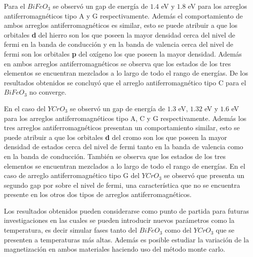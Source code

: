Para el $BiFeO_{3}$ se observ\'o un gap de energ\'ia de $1.4$ eV y $1.8$ eV 
para los arreglos antiferromagn\'eticos tipo A y G respectivamente. Adem\'as  
el comportamiento de ambos arreglos 
antiferromagn\'eticos es similar, esto se puede atribuir a que los orbitales 
\textbf{d} del hierro 
son los que poseen la mayor densidad cerca del nivel de fermi en la banda de 
conducci\'on y en la banda de valencia cerca del nivel de fermi son los 
orbitales \textbf{p} del ox\'igeno los que poseen la mayor densidad. Adem\'as 
en ambos arreglos antiferromagn\'eticos se observa que los estados de los tres 
elementos se encuentran mezclados a lo largo de todo el rango de energ\'ias. De 
los resultados obtenidos se concluy\'o que el arreglo antiferromagn\'etico tipo 
C para el $BiFeO_{3}$ no converge.


\noindent En el caso del $YCrO_{3}$ se observ\'o un gap de energ\'ia de $1.3$ 
eV, $1.32$ eV y $1.6$ eV 
para los arreglos antiferromagn\'eticos tipo A, C y G respectivamente. Adem\'as 
los tres arreglos antiferromagn\'eticos presentan un comportamiento similar, 
esto se puede atribuir a que 
los orbitales \textbf{d} del cromo son los que poseen la mayor densidad de 
estados cerca del nivel de fermi tanto en la banda de valencia como en la banda 
de conducci\'on. Tambi\'en se observa que los estados de los tres elementos se 
encuentran mezclados a lo largo de todo el rango de energ\'ias.
En el caso de arreglo antiferromagn\'etico tipo G del $YCrO_{3}$ se observ\'o 
que presenta un segundo gap por sobre el nivel de fermi, una caracter\'istica 
que no se encuentra presente en los otros dos tipos de arreglos 
antiferromagn\'eticos.

\noindent Los resultados obtenidos pueden considerarse como punto de partida 
para futuras investigaciones en las cuales se pueden introducir nuevos 
par\'ametros como la temperatura, es decir simular fases tanto del $BiFeO_{3}$ 
como del $YCrO_{3}$ que se presenten a temperaturas m\'as altas. Adem\'as es 
posible estudiar la variaci\'on de la magnetizaci\'on en ambos materiales 
haciendo uso del m\'etodo monte carlo.